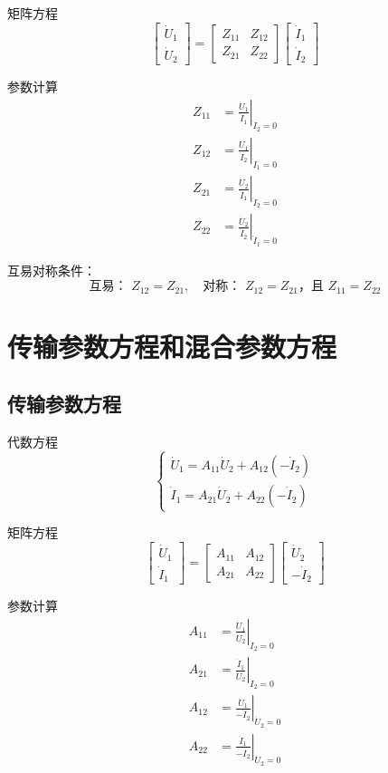 矩阵方程
\[
\begin{bmatrix}
\dot{U}_1 \\
\dot{U}_2
\end{bmatrix}
=
\begin{bmatrix}
Z_{11} & Z_{12} \\
Z_{21} & Z_{22}
\end{bmatrix}
\begin{bmatrix}
\dot{I}_1 \\
\dot{I}_2
\end{bmatrix}
\]

参数计算
\[
\begin{align*}
Z_{11} &= \left. \frac{\dot{U}_1}{\dot{I}_1} \right|_{\dot{I}_2 = 0} \\
Z_{12} &= \left. \frac{\dot{U}_1}{\dot{I}_2} \right|_{\dot{I}_1 = 0} \\
Z_{21} &= \left. \frac{\dot{U}_2}{\dot{I}_1} \right|_{\dot{I}_2 = 0} \\
Z_{22} &= \left. \frac{\dot{U}_2}{\dot{I}_2} \right|_{\dot{I}_1 = 0}
\end{align*}
\]

互易对称条件：
\[
\text{互易： } Z_{12} = Z_{21},\quad
\text{对称： } Z_{12} = Z_{21} \text{，且 } Z_{11} = Z_{22}
\]

\section{传输参数方程和混合参数方程}
\subsection{传输参数方程}
代数方程
\[
\begin{cases}
\dot{U}_1 = A_{11}\dot{U}_2 + A_{12}(-\dot{I}_2) \\
\dot{I}_1 = A_{21}\dot{U}_2 + A_{22}(-\dot{I}_2)
\end{cases}
\]

矩阵方程
\[
\begin{bmatrix}
\dot{U}_1 \\
\dot{I}_1
\end{bmatrix}
=
\begin{bmatrix}
A_{11} & A_{12} \\
A_{21} & A_{22}
\end{bmatrix}
\begin{bmatrix}
\dot{U}_2 \\
-\dot{I}_2
\end{bmatrix}
\]

参数计算
\[
\begin{align*}
A_{11} &= \left. \frac{\dot{U}_1}{\dot{U}_2} \right|_{\dot{I}_2 = 0} \\
A_{21} &= \left. \frac{\dot{I}_1}{\dot{U}_2} \right|_{\dot{I}_2 = 0} \\
A_{12} &= \left. \frac{\dot{U}_1}{-\dot{I}_2} \right|_{\dot{U}_2 = 0} \\
A_{22} &= \left. \frac{\dot{I}_1}{-\dot{I}_2} \right|_{\dot{U}_2 = 0}
\end{align*}
\]

